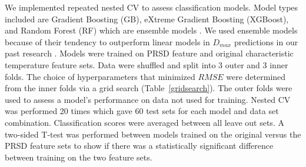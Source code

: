 \documentclass[11pt,a4paper]{article}                                %
\begin{document}
\par
We implemented repeated nested CV to assess classification models. Model types included are Gradient Boosting (GB), eXtreme Gradient Boosting (XGBoost), and Random Forest (RF) which are ensemble models \cite{Pavlov2019, Friedman2001, xgboost}. We used ensemble models because of their tendency to outperform linear models in $D_{max}$ predictions in our past research \cite{SCHULTZ2021110494}. Models were trained on PRSD feature and original characteristic temperature feature sets. Data were shuffled and split into 3 outer and 3 inner folds. The choice of hyperparameters that minimized $RMSE$ were determined from the inner folds via a grid search (Table~\ref{gridsearch}). The outer folds were used to assess a model's performance on data not used for training. Nested CV was performed 20 times which gave 60 test sets for each model and data set combination. Classification scores were averaged between all leave out sets. A two-sided T-test was performed between models trained on the original versus the PRSD feature sets to show if there was a statistically significant difference between training on the two feature sets.
\end{document}
